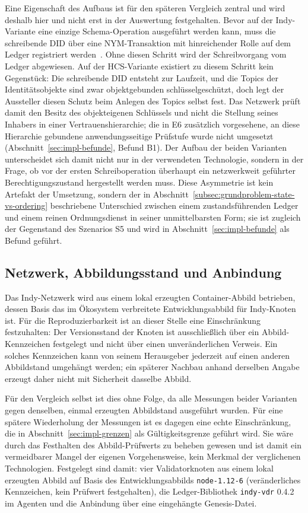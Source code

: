 Eine Eigenschaft des Aufbaus ist für den späteren Vergleich zentral und wird deshalb hier und nicht erst in der Auswertung festgehalten. Bevor auf der Indy-Variante eine einzige Schema-Operation ausgeführt werden kann, muss die schreibende DID über eine NYM-Transaktion mit hinreichender Rolle auf dem Ledger registriert werden~\cite{torongo2023}. Ohne diesen Schritt wird der Schreibvorgang vom Ledger abgewiesen. Auf der HCS-Variante existiert zu diesem Schritt kein Gegenstück: Die schreibende DID entsteht zur Laufzeit, und die Topics der Identitätsobjekte sind zwar objektgebunden schlüsselgeschützt, doch legt der Aussteller diesen Schutz beim Anlegen des Topics selbst fest. Das Netzwerk prüft damit den Besitz des objekteigenen Schlüssels und nicht die Stellung seines Inhabers in einer Vertrauenshierarchie; die in E6 zusätzlich vorgesehene, an diese Hierarchie gebundene anwendungsseitige Prüfstufe wurde nicht umgesetzt (Abschnitt~\ref{sec:impl-befunde}, Befund B1). Der Aufbau der beiden Varianten unterscheidet sich damit nicht nur in der verwendeten Technologie, sondern in der Frage, ob vor der ersten Schreiboperation überhaupt ein netzwerkweit geführter Berechtigungszustand hergestellt werden muss. Diese Asymmetrie ist kein Artefakt der Umsetzung, sondern der in Abschnitt~\ref{subsec:grundproblem-state-vs-ordering} beschriebene Unterschied zwischen einem zustandsführenden Ledger und einem reinen Ordnungsdienst in seiner unmittelbarsten Form; sie ist zugleich der Gegenstand des Szenarios S5 und wird in Abschnitt~\ref{sec:impl-befunde} als Befund geführt.

\subsection{Netzwerk, Abbildungsstand und Anbindung}
\label{subsec:impl-indy-netzwerk}

Das Indy-Netzwerk wird aus einem lokal erzeugten Container-Abbild betrieben, dessen Basis das im Ökosystem verbreitete Entwicklungsabbild für Indy-Knoten ist. Für die Reproduzierbarkeit ist an dieser Stelle eine Einschränkung festzuhalten: Der Versionsstand der Knoten ist ausschließlich über ein Abbild-Kennzeichen festgelegt und nicht über einen unveränderlichen Verweis. Ein solches Kennzeichen kann von seinem Herausgeber jederzeit auf einen anderen Abbildstand umgehängt werden; ein späterer Nachbau anhand derselben Angabe erzeugt daher nicht mit Sicherheit dasselbe Abbild. 

Für den Vergleich selbst ist dies ohne Folge, da alle Messungen beider Varianten gegen denselben, einmal erzeugten Abbildstand ausgeführt wurden. Für eine spätere Wiederholung der Messungen ist es dagegen eine echte Einschränkung, die in Abschnitt~\ref{sec:impl-grenzen} als Gültigkeitsgrenze geführt wird. Sie wäre durch das Festhalten des Abbild-Prüfwerts zu beheben gewesen und ist damit ein vermeidbarer Mangel der eigenen Vorgehensweise, kein Merkmal der verglichenen Technologien. Festgelegt sind damit: vier Validatorknoten aus einem lokal erzeugten Abbild auf Basis des Entwicklungsabbilds \texttt{node-1.12-6} (veränderliches Kennzeichen, kein Prüfwert festgehalten), die Ledger-Bibliothek \texttt{indy-vdr} 0.4.2 im Agenten und die Anbindung über eine eingehängte Genesis-Datei.

